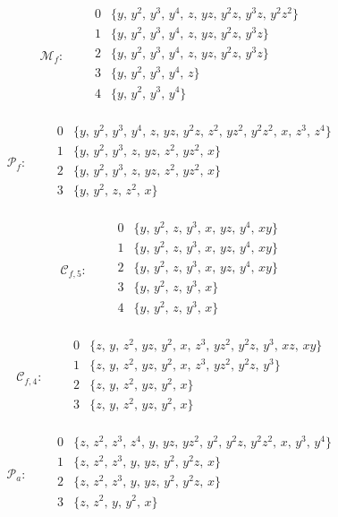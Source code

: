 \documentclass[11pt]{amsart}
\theoremstyle{definition}
\theoremstyle{remark}
\numberwithin{equation}{section}
\begin{document}
\[
\mathcal M_f:\qquad\begin{array}{c|l}
0&\{y,\,y^{2},\,y^{3},\,y^{4},\,z,\,yz,\,y^{2}z,\,y^{3}z,\,y^{2}z^{2}\}\\
1&\{y,\,y^{2},\,y^{3},\,y^{4},\,z,\,yz,\,y^{2}z,\,y^{3}z\}\\
2&\{y,\,y^{2},\,y^{3},\,y^{4},\,z,\,yz,\,y^{2}z,\,y^{3}z\}\\
3&\{y,\,y^{2},\,y^{3},\,y^{4},\,z\}\\
4&\{y,\,y^{2},\,y^{3},\,y^{4}\}\\
\end{array}
\]

\[
\mathcal P_f:\qquad\begin{array}{c|l}
0&\{y,\,y^{2},\,y^{3},\,y^{4},\,z,\,yz,\,y^{2}z,\,z^{2},\,yz^{2},\,y^{2}z^{2},\,x,\,z^{3},\,z^{4}\}\\
1&\{y,\,y^{2},\,y^{3},\,z,\,yz,\,z^{2},\,yz^{2},\,x\}\\
2&\{y,\,y^{2},\,y^{3},\,z,\,yz,\,z^{2},\,yz^{2},\,x\}\\
3&\{y,\,y^{2},\,z,\,z^{2},\,x\}\\
\end{array}
\]

\[
\mathcal C_{f,5}:\qquad\begin{array}{c|l}
0&\{y,\,y^{2},\,z,\,y^{3},\,x,\,yz,\,y^{4},\,xy\}\\
1&\{y,\,y^{2},\,z,\,y^{3},\,x,\,yz,\,y^{4},\,xy\}\\
2&\{y,\,y^{2},\,z,\,y^{3},\,x,\,yz,\,y^{4},\,xy\}\\
3&\{y,\,y^{2},\,z,\,y^{3},\,x\}\\
4&\{y,\,y^{2},\,z,\,y^{3},\,x\}\\
\end{array}
\]

\[
\mathcal C_{f,4}:\qquad\begin{array}{c|l}
0&\{z,\,y,\,z^{2},\,yz,\,y^{2},\,x,\,z^{3},\,yz^{2},\,y^{2}z,\,y^{3},\,xz,\,xy\}\\
1&\{z,\,y,\,z^{2},\,yz,\,y^{2},\,x,\,z^{3},\,yz^{2},\,y^{2}z,\,y^{3}\}\\
2&\{z,\,y,\,z^{2},\,yz,\,y^{2},\,x\}\\
3&\{z,\,y,\,z^{2},\,yz,\,y^{2},\,x\}\\
\end{array}
\]

\[
\mathcal P_a:\qquad\begin{array}{c|l}
0&\{z,\,z^{2},\,z^{3},\,z^{4},\,y,\,yz,\,yz^{2},\,y^{2},\,y^{2}z,\,y^{2}z^{2},\,x,\,y^{3},\,y^{4}\}\\
1&\{z,\,z^{2},\,z^{3},\,y,\,yz,\,y^{2},\,y^{2}z,\,x\}\\
2&\{z,\,z^{2},\,z^{3},\,y,\,yz,\,y^{2},\,y^{2}z,\,x\}\\
3&\{z,\,z^{2},\,y,\,y^{2},\,x\}\\
\end{array}
\]
\end{document}
